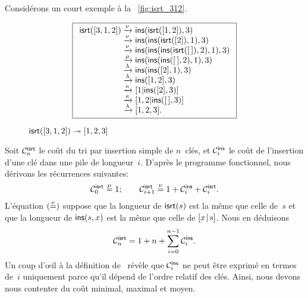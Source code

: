 Considérons un court exemple à la \fig~\vref{fig:isrt_312}.
\begin{figure}
\begin{equation*}
\boxed{%
\begin{array}{r@{\;}l@{\;}l}
\fun{isrt}([3,1,2])
& \xrightarrow{\smash{\nu}} & \fun{ins}(\fun{isrt}([1,2]),3)\\
& \xrightarrow{\smash{\nu}}
& \fun{ins}(\fun{ins}(\fun{isrt}([2]),1),3)\\
& \xrightarrow{\smash{\nu}}
& \fun{ins}(\fun{ins}(\fun{ins}(\fun{isrt}(\el),2),1),3)\\
& \xrightarrow{\smash{\mu}}
& \fun{ins}(\fun{ins}(\fun{ins}(\el,2),1),3)\\
& \xrightarrow{\smash{\lambda}}
& \fun{ins}(\fun{ins}([2],1),3)\\
& \xrightarrow{\smash{\lambda}}
& \fun{ins}([1,2],3)\\
& \xrightarrow{\smash{\kappa}}
& [1|\fun{ins}([2],3)]\\
& \xrightarrow{\smash{\kappa}}
& [1,2|\fun{ins}(\el,3)]\\
& \xrightarrow{\smash{\lambda}}
& [1,2,3].
\end{array}}
\end{equation*}
\caption{\(\fun{isrt}([3,1,2]) \twoheadrightarrow [1,2,3]\)}
\label{fig:isrt_312}
\end{figure}
 

Soit \(\C{\fun{isrt}}{n}\) le coût
du tri par insertion simple de \(n\)~clés, et \(\C{\fun{ins}}{i}\) le
coût de l'insertion d'une clé dans une pile de longueur~\(i\). D'après
le programme fonctionnel, nous dérivons les récurrences suivantes:
\begin{equation*}
\C{\fun{isrt}}{0}   \eqn{\smash{\mu}} 1;\qquad
\C{\fun{isrt}}{i+1} \eqn{\smash{\nu}} 1 + \C{\fun{ins}}{i} +
  \C{\fun{isrt}}{i}.
\end{equation*}
L'équation \((\eqn{\smash{\nu}})\) suppose que la longueur de
\(\fun{isrt}(s)\) est la même que celle de~\(s\) et que la longueur de
\(\fun{ins}(s,x)\) est la même que celle de \(\cons{x}{s}\). Nous en
déduisons
\begin{equation}
\C{\fun{isrt}}{n} = 1 + n + \sum_{i=0}^{n-1}\C{\fun{ins}}{i}.
\label{eq:cost_isrt}
\end{equation}
Un coup d'œil à la définition de~ révèle que
\(\C{\fun{ins}}{i}\) ne peut être exprimé en termes de~\(i\)
uniquement parce qu'il dépend de l'ordre relatif des clés. Ainsi, nous
devons nous contenter du coût minimal, maximal et
moyen.

